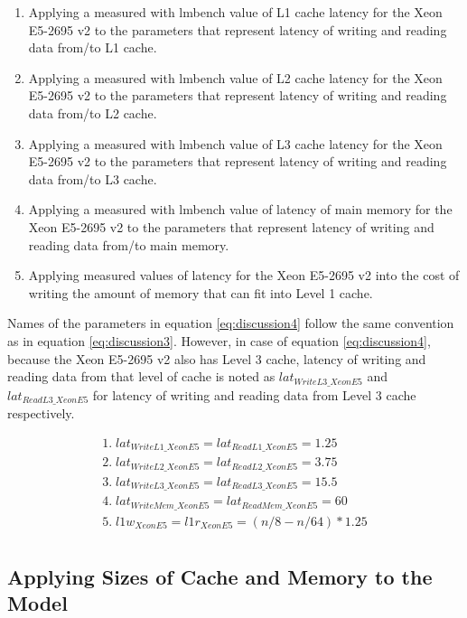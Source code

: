 \begin{enumerate}
  \item Applying a measured with lmbench value of L1 cache latency for the Xeon E5-2695 v2 to the parameters that represent latency of writing and reading data from/to L1 cache.
  \item Applying a measured with lmbench value of L2 cache latency for the Xeon E5-2695 v2 to the parameters that represent latency of writing and reading data from/to L2 cache.
  \item Applying a measured with lmbench value of L3 cache latency for the Xeon E5-2695 v2 to the parameters that represent latency of writing and reading data from/to L3 cache.
  \item Applying a measured with lmbench value of latency of main memory for the Xeon E5-2695 v2 to the parameters that represent latency of writing and reading data from/to main memory.
  \item Applying measured values of latency for the Xeon E5-2695 v2 into the cost of writing the amount of memory that can fit into Level 1 cache.
\end{enumerate}

Names of the parameters in equation \ref{eq:discussion4} follow the same convention as in equation \ref{eq:discussion3}. However, in case of equation \ref{eq:discussion4}, because the Xeon E5-2695 v2 also has Level 3 cache, latency of writing and reading data from that level of cache is noted as $lat_{WriteL3\_XeonE5}$ and $lat_{ReadL3\_XeonE5}$ for latency of writing and reading data from Level 3 cache respectively.

\begin{equation}\label{eq:discussion4}
\begin{split}
1.\; lat_{WriteL1\_XeonE5} = lat_{ReadL1\_XeonE5} = 1.25 \\
2.\; lat_{WriteL2\_XeonE5} = lat_{ReadL2\_XeonE5} = 3.75 \\
3.\; lat_{WriteL3\_XeonE5} = lat_{ReadL3\_XeonE5} = 15.5 \\
4.\; lat_{WriteMem\_XeonE5} = lat_{ReadMem\_XeonE5} = 60 \\
5.\; l1w_{XeonE5} = l1r_{XeonE5} = (n/8 - n/64) * 1.25 \\ 
\end{split}
\end{equation}

\subsection{Applying Sizes of Cache and Memory to the Model}

